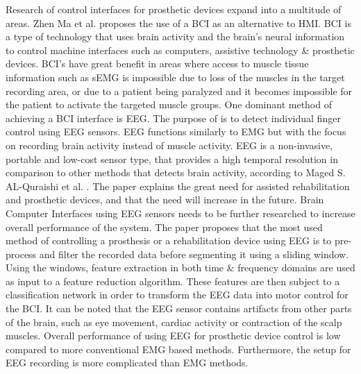 \documentclass[../main.tex]{subfiles}
\begin{document}
Research of control interfaces for prosthetic devices expand into a multitude of areas.
Zhen Ma et al. \cite{fnins2016} proposes the use of a \gls{BCI} as an alternative to \gls{HMI}.
BCI is a type of technology that uses brain activity and the brain's neural information to control machine interfaces such as computers, assistive technology \& prosthetic devices.
BCI's have great benefit in areas where access to muscle tissue information such as sEMG is impossible due to loss of the muscles in the target recording area, or due to a patient being paralyzed and it becomes impossible for the patient to activate the targeted muscle groups.
One dominant method of achieving a BCI interface is \gls{EEG}.
The purpose of \cite{fnins2016} is to detect individual finger control using EEG sensors. 
EEG functions similarly to EMG but with the focus on recording brain activity instead of muscle activity.
EEG is a non-invasive, portable and low-cost sensor type, that provides a high temporal resolution in comparison to other methods that detects brain activity, according to Maged S. AL-Quraishi et al. \cite{quraishi2018}.
The paper explains the great need for assisted rehabilitation and prosthetic devices, and that the need will increase in the future.
Brain Computer Interfaces using EEG sensors needs to be further researched to increase overall performance of the system.
The paper proposes that the most used method of controlling a prosthesis or a rehabilitation device using EEG is to pre-process and filter the recorded data before segmenting it using a sliding window.
Using the windows, feature extraction in both time \& frequency domains are used as input to a feature reduction algorithm.
These features are then subject to a classification network in order to transform the EEG data into motor control for the BCI.
It can be noted that the EEG sensor contains artifacts from other parts of the brain, such as eye movement, cardiac activity or contraction of the scalp muscles. 
Overall performance of using EEG for prosthetic device control is low compared to more conventional EMG based methods.
Furthermore, the setup for EEG recording is more complicated than EMG methods.
\end{document}

